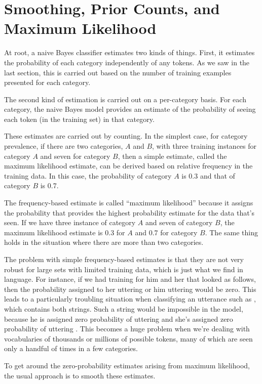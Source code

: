 \section{Smoothing, Prior Counts, and Maximum Likelihood}

At root, a naive Bayes classifier estimates two kinds of things.  First,
it estimates the probability of each category independently of any
tokens.  As we saw in the last section, this is carried out based on
the number of training examples presented for each category.

The second kind of estimation is carried out on a per-category basis.
For each category, the naive Bayes model provides an estimate of the
probability of seeing each token (in the training set) in that
category.

These estimates are carried out by counting.  In the simplest case,
for category prevalence, if there are two categories, $A$ and $B$,
with three training instances for category $A$ and seven for category
$B$, then a simple estimate, called the maximum likelihood estimate,
can be derived based on relative frequency in the training data.  In
this case, the probability of category $A$ is 0.3 and that of category
$B$ is 0.7.  

The frequency-based estimate is called ``maximum likelihood'' because
it assigns the probability that provides the highest probability
estimate for the data that's seen.  If we have three instance of
category $A$ and seven of category $B$, the maximum likelihood
estimate is 0.3 for $A$ and 0.7 for category $B$.  The same thing
holds in the situation where there are more than two categories.

The problem with simple frequency-based estimates is that they are not
very robust for large sets with limited training data, which is just
what we find in language.  For instance, if we had training for
him and her that looked as follows,
%
%
then the probability assigned to her uttering  or
him uttering  would be zero.  This leads to a
particularly troubling situation when classifying an utterance such as
, which contains both strings.  Such a
string would be impossible in the model, because he is assigned zero
probability of uttering  and she's assigned zero
probability of uttering .  This becomes a huge problem
when we're dealing with vocabularies of thousands or millions of 
possible tokens, many of which are seen only a handful of times in
a few categories.

To get around the zero-probability estimates arising from maximum
likelihood, the usual approach is to smooth these estimates.  






